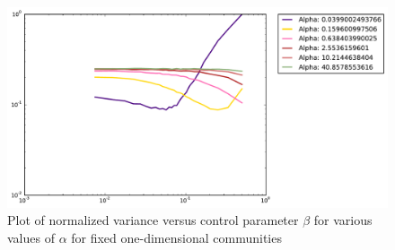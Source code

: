 \begin{figure}[h!]
\begin{center}
\includegraphics[scale=0.4]{images/results/vicinity_patch_n401_rounds10000_partial.pdf}
\caption{Plot of normalized variance versus control parameter $\beta$ for various values of $\alpha$  for fixed one-dimensional communities}
\label{fig:patch vicinity partial}
\end{center}
\end{figure}

